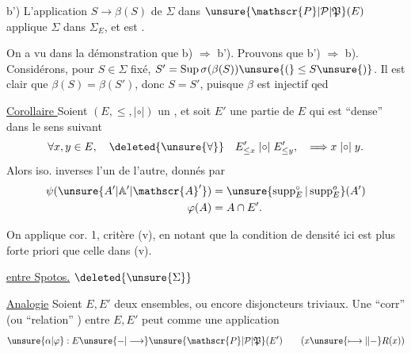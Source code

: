 b') L'application $S\longrightarrow\beta(S)$ de $\Sigma$ dans $\unsure{\mathscr{P}|\mathcal{P}|\mathfrak{P}}(E)$ applique $\Sigma$ dans $\Sigma_E$, et est .

On a vu dans la démonstration que b) $\Longrightarrow$ b'). Prouvons que b') $\Longrightarrow$ b). Considérons, pour $S\in\Sigma$ fixé, $S'=\operatorname{Sup}\sigma(\beta(S))\unsure{(}\leq S\unsure{)}$. Il est clair que $\beta(S)=\beta(S')$, donc $S=S'$, puisque $\beta$ est injectif qed


\uline{Corollaire } Soient $(E,\leq,\mathrel{|{\circ}|})$ un  , et soit $E'$ une partie de $E$ qui est ``dense'' dans le sens suivant
\[
\forall x,y\in E,\quad\deleted{\unsure{\forall}}\quad
E'_{\leq x}\mathrel{|{\circ}|}E'_{\leq y},\quad\Longrightarrow x\mathrel{|{\circ}|}y.
\]
Alors
iso. inverses l'un de l'autre, donnés par
\[
\begin{aligned}
\psi(\unsure{A'|\mathbb{A}'|\mathscr{A}'})&=\unsure{\operatorname{supp}^{\circ}_E|\operatorname{supp}^{o}_E}(A')\\
\varphi(A)&=A\cap E'.
\end{aligned}
\]

On applique cor. 1, critère (v), en notant que la condition de densité ici est plus forte  priori que celle dans (v).


 \uline{ entre  Spotos.} $\deleted{\unsure{\Sigma}}$

 \uline{Analogie} Soient $E,E'$ deux ensembles,  ou encore disjoncteurs triviaux. Une ``corr'' (ou ``relation'' ) entre $E,E'$ peut   comme une application
\[
\unsure{\alpha|\varphi}:E\unsure{{-}|\longrightarrow}\unsure{\mathscr{P}|\mathcal{P}|\mathfrak{P}}(E')
\qquad(x\unsure{\longmapsto|{\mid}{-}}R(x))
\]

